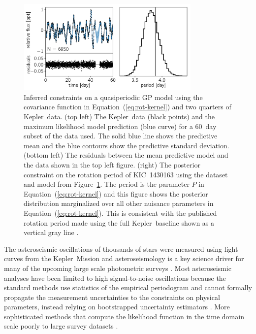 \documentclass[manuscript, letterpaper]{aastex6}
\makeatletter
\let\origsubsection\subsection
\renewcommand\subsection{\@ifstar{\starsubsection}{\nostarsubsection}}
\newcommand\nostarsubsection[1]{\subsectionprelude\origsubsection{#1}}
\newcommand\starsubsection[1]{\subsectionprelude\origsubsection*{#1}}
\newcommand\subsectionprelude{\vspace{1em}}
\newcommand{\project}[1]{\textsf{#1}}
\newcommand{\kepler}{\project{Kepler}}
\newcommand{\figureref}[1]{\ref{fig:#1}}
\newcommand{\Figure}[1]{Figure~\figureref{#1}}
\newcommand{\figurelabel}[1]{\label{fig:#1}}
\renewcommand{\eqref}[1]{\ref{eq:#1}}
\newcommand{\Eq}[1]{Equation~(\eqref{#1})}
\newcommand{\eq}[1]{\Eq{#1}}
\makeatother
\begin{document}
\begin{figure}[p]
\begin{center}
\includegraphics[width=0.8\textwidth]{figures/rotation/rotation.pdf}
\caption{Inferred constraints on a quasiperiodic GP model using the covariance
    function in \eq{rot-kernel} and two quarters of \kepler\ data.
(top left) The \kepler\ data (black points) and the maximum likelihood model
    prediction (blue curve) for a 60~day subset of the data used.
    The solid blue line shows the predictive mean and the blue contours show
    the predictive standard deviation.
(bottom left) The residuals between the mean predictive model and the data
    shown in the top left figure.
(right) The posterior constraint on the rotation period of KIC~1430163 using
    the dataset and model from \Figure{rotation}.
    The period is the parameter $P$ in \eq{rot-kernel} and this figure shows
    the posterior distribution marginalized over all other nuisance parameters
    in \eq{rot-kernel}.
    This is consistent with the published rotation period made using the full
    \kepler\ baseline shown as a vertical gray line \citep{Mathur:2014}.
    \figurelabel{rotation}}
\end{center}
\end{figure}

\subsection{Example 4: Asteroseismic oscillations}

The asteroseismic oscillations of thousands of stars were measured using light
curves from the \kepler\ Mission \citep{Gilliland:2010, Huber:2011,
Chaplin:2011, Chaplin:2013, Stello:2013} and asteroseismology is a key science
driver for many of the upcoming large scale photometric surveys
\citep{Campante:2016, Rauer:2014, Gould:2015}.
Most asteroseismic analyses have been limited to high signal-to-noise
oscillations because the standard methods use statistics of the empirical
periodogram and cannot formally propagate the measurement uncertainties to the
constraints on physical parameters, instead relying on bootstrapped
uncertainty estimators \citep{Huber:2009}.
More sophisticated methods that compute the likelihood function in the time
domain scale poorly to large survey datasets \citep{Brewer:2009,
Corsaro:2014}.
\end{document}
